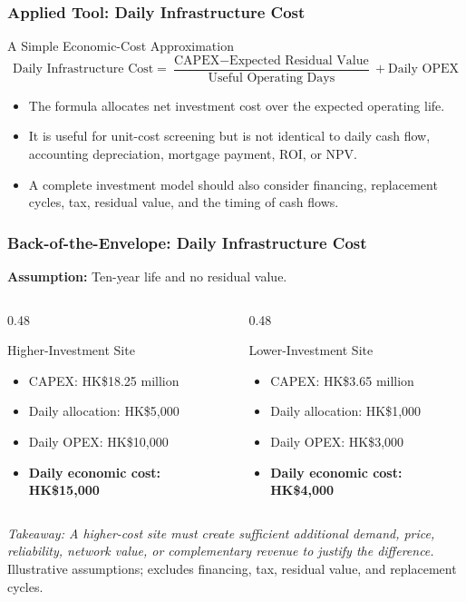 \documentclass{beamer}
\begin{document}
\begin{frame}[t]
\frametitle{Applied Tool: Daily Infrastructure Cost}
\begin{block}{A Simple Economic-Cost Approximation}
\[
\text{Daily Infrastructure Cost}
=
\frac{\text{CAPEX}-\text{Expected Residual Value}}{\text{Useful Operating Days}}
+\text{Daily OPEX}
\]
\end{block}
\begin{itemize}
\item The formula allocates net investment cost over the expected operating life.
\item It is useful for unit-cost screening but is not identical to daily cash flow, accounting depreciation, mortgage payment, ROI, or NPV.
\item A complete investment model should also consider financing, replacement cycles, tax, residual value, and the timing of cash flows.
\end{itemize}
\end{frame}

\begin{frame}[t,shrink=10]
\frametitle{Back-of-the-Envelope: Daily Infrastructure Cost}
\textbf{Assumption:} Ten-year life and no residual value.
\begin{columns}[T]
\begin{column}{0.48\textwidth}\begin{block}{Higher-Investment Site}
\begin{itemize}
\item CAPEX: HK\$18.25 million
\item Daily allocation: HK\$5,000
\item Daily OPEX: HK\$10,000
\item \textbf{Daily economic cost: HK\$15,000}
\end{itemize}\end{block}\end{column}
\begin{column}{0.48\textwidth}\begin{block}{Lower-Investment Site}
\begin{itemize}
\item CAPEX: HK\$3.65 million
\item Daily allocation: HK\$1,000
\item Daily OPEX: HK\$3,000
\item \textbf{Daily economic cost: HK\$4,000}
\end{itemize}\end{block}\end{column}
\end{columns}
\textit{Takeaway: A higher-cost site must create sufficient additional demand, price, reliability, network value, or complementary revenue to justify the difference.}
\vfill{\tiny Illustrative assumptions; excludes financing, tax, residual value, and replacement cycles.}
\end{frame}
\end{document}
